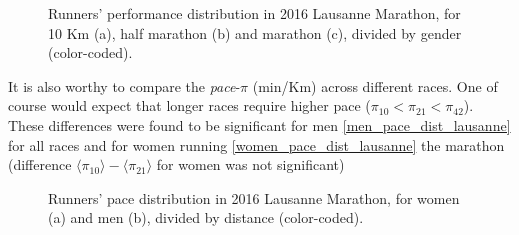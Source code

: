 \documentclass[fleqn,10pt]{wlscirep}
\begin{document}
\begin{figure}[h]
 			\caption{Runners' performance distribution in 2016 Lausanne Marathon, for 10 Km (a), half marathon (b) and marathon (c), divided by gender (color-coded).}
 		\end{figure}		 		
 	
 	
 	
 		It is  also worthy to compare the \textit{pace}-$ \pi $ (min/Km) across different races. 
 		One of course would expect that longer races require higher pace ($ \pi_{10} < \pi_{21} < \pi_{42} $). 
 		These differences were found to be significant for men \ref{men_pace_dist_lausanne} for all races and for women running  \ref{women_pace_dist_lausanne} the marathon (difference $ \langle \pi_{10}  \rangle -  \langle \pi_{21}  \rangle $ for women was not significant)
 		
		\begin{figure}[h]	
 			\centering
 			
 		
 			\caption{Runners' pace distribution in 2016 Lausanne Marathon, for women (a) and men (b), divided by distance (color-coded).}
 		\end{figure}		 		
	
\end{document}

